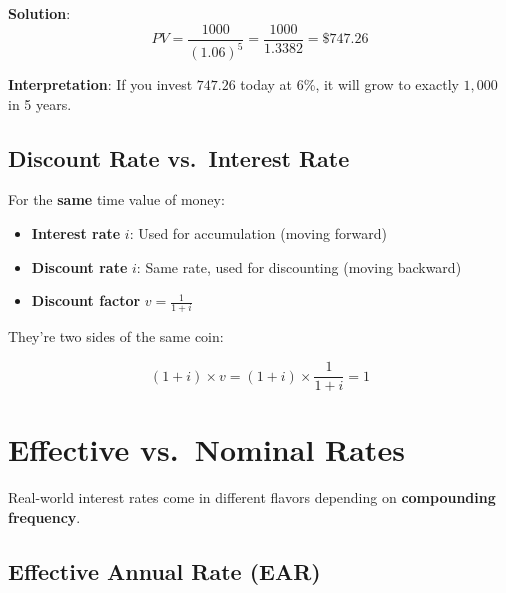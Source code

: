 \documentclass[
  letterpaper,
]{scrbook}
\providecommand{\tightlist}{%
  \setlength{\itemsep}{0pt}\setlength{\parskip}{0pt}}
\begin{document}
\textbf{Solution}: \[
PV = \frac{1000}{(1.06)^5} = \frac{1000}{1.3382} = \$747.26
\]

\textbf{Interpretation}: If you invest \(747.26\) today at 6\%, it will
grow to exactly \(1,000\) in 5 years.

\subsection{Discount Rate vs.~Interest
Rate}\label{discount-rate-vs.-interest-rate}

\begin{tcolorbox}[enhanced jigsaw, toptitle=1mm, colbacktitle=quarto-callout-important-color!10!white, opacityback=0, leftrule=.75mm, breakable, colframe=quarto-callout-important-color-frame, toprule=.15mm, opacitybacktitle=0.6, coltitle=black, bottomrule=.15mm, colback=white, arc=.35mm, titlerule=0mm, rightrule=.15mm, left=2mm, title=\textcolor{quarto-callout-important-color}{\faExclamation}\hspace{0.5em}{Key Relationship}, bottomtitle=1mm]

For the \textbf{same} time value of money:

\begin{itemize}
\tightlist
\item
  \textbf{Interest rate} \(i\): Used for accumulation (moving forward)
\item
  \textbf{Discount rate} \(i\): Same rate, used for discounting (moving
  backward)
\item
  \textbf{Discount factor} \(v = \frac{1}{1+i}\)
\end{itemize}

They're two sides of the same coin:

\[
(1+i) \times v = (1+i) \times \frac{1}{1+i} = 1
\]

\end{tcolorbox}

\section{Effective vs.~Nominal Rates}\label{effective-vs.-nominal-rates}

Real-world interest rates come in different flavors depending on
\textbf{compounding frequency}.

\subsection{Effective Annual Rate
(EAR)}\label{effective-annual-rate-ear}
\end{document}
